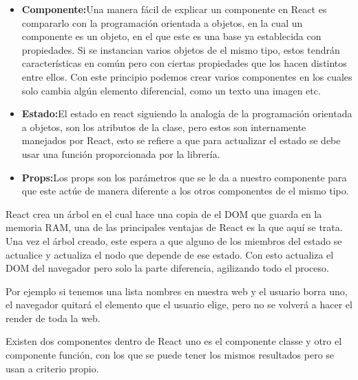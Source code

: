 \begin{itemize}
\begin{itemize}
 
 \item \textbf{Componente:}Una manera fácil de explicar un componente en React es compararlo con la programación orientada a objetos, en la cual un componente es un objeto, en el que este es una base ya establecida con propiedades. Si se instancian varios objetos de el mismo tipo, estos tendrán características en común pero con ciertas propiedades que los hacen distintos entre ellos. Con este principio podemos crear varios componentes en los cuales solo cambia algún elemento diferencial, como un texto una imagen etc.
  \item \textbf{Estado:}El estado en react siguiendo la analogía de la programación orientada a objetos, son los atributos de la clase, pero estos son internamente manejados por React, esto se refiere a que para actualizar el estado se debe usar una función proporcionada por la librería.
   \item \textbf{Props:}Los props son los parámetros  que se le da a nuestro componente para que este actúe de manera diferente a los otros componentes de el mismo tipo.
 \end{itemize}
 React crea un árbol en el cual hace una copia de el DOM que guarda en la memoria RAM, una de las principales ventajas de React es la que aquí se trata. Una vez el árbol creado, este espera a que alguno de los miembros del estado se actualice y actualiza el nodo que depende de ese estado. Con esto actualiza el DOM del navegador pero solo la parte diferencia, agilizando todo el proceso.

Por ejemplo si tenemos una lista nombres en nuestra web y el usuario borra uno, el navegador quitará el elemento que el usuario elige, pero no se volverá a hacer el render de toda la web.

Existen dos componentes dentro de React uno es el componente classe y otro el componente función, con los que se puede tener los mismos resultados pero se usan a criterio propio.


\end{itemize}
